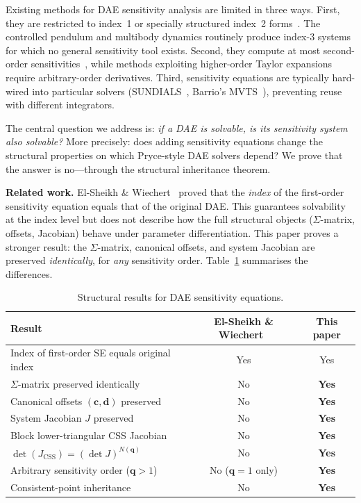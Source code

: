 \documentclass[12pt,a4paper]{article}
\theoremstyle{definition}
\theoremstyle{plain}
\theoremstyle{remark}
\newcommand{\vq}{\mathbf{q}}
\newcommand{\vc}{\mathbf{c}}
\newcommand{\vd}{\mathbf{d}}
\begin{document}
Existing methods for DAE sensitivity analysis are limited in three ways. First, they are restricted to index~1 or specially structured index~2 forms~\cite{li2000sensitivity,cao2002adjoint,cao2003adjoint,rauh2017sensitivity}. The controlled pendulum and multibody dynamics routinely produce index-3 systems for which no general sensitivity tool exists. Second, they compute at most second-order sensitivities~\cite{barrio2006sensitivity}, while methods exploiting higher-order Taylor expansions require arbitrary-order derivatives. Third, sensitivity equations are typically hard-wired into particular solvers (SUNDIALS~\cite{gardner2022sundials}, Barrio's MVTS~\cite{barrio2006sensitivity}), preventing reuse with different integrators.

The central question we address is: \emph{if a DAE is solvable, is its sensitivity system also solvable?} More precisely: does adding sensitivity equations change the structural properties on which Pryce-style DAE solvers depend? We prove that the answer is no---through the structural inheritance theorem.

\medskip\noindent\textbf{Related work.}
El-Sheikh \& Wiechert~\cite{elsheikh2018structural} proved that the \emph{index} of the first-order sensitivity equation equals that of the original DAE. This guarantees solvability at the index level but does not describe how the full structural objects ($\Sigma$-matrix, offsets, Jacobian) behave under parameter differentiation. This paper proves a stronger result: the $\Sigma$-matrix, canonical offsets, and system Jacobian are preserved \emph{identically}, for \emph{any} sensitivity order. Table~\ref{tab:comparison} summarises the differences.

\begin{table}[htbp]
  \centering
  \caption{Structural results for DAE sensitivity equations.}
  \label{tab:comparison}
  \begin{tabular}{lcc}
    \toprule
    Result & El-Sheikh \& Wiechert~\cite{elsheikh2018structural} & This paper \\
    \midrule
    Index of first-order SE equals original index & Yes & Yes \\
    $\Sigma$-matrix preserved identically & No & \textbf{Yes} \\
    Canonical offsets $(\vc,\vd)$ preserved & No & \textbf{Yes} \\
    System Jacobian $J$ preserved & No & \textbf{Yes} \\
    Block lower-triangular CSS Jacobian & No & \textbf{Yes} \\
    $\det(J_{\text{CSS}}) = (\det J)^{N(\vq)}$ & No & \textbf{Yes} \\
    Arbitrary sensitivity order ($\vq > 1$) & No ($\vq=1$ only) & \textbf{Yes} \\
    Consistent-point inheritance & No & \textbf{Yes} \\
    \bottomrule
  \end{tabular}
\end{table}
\end{document}
